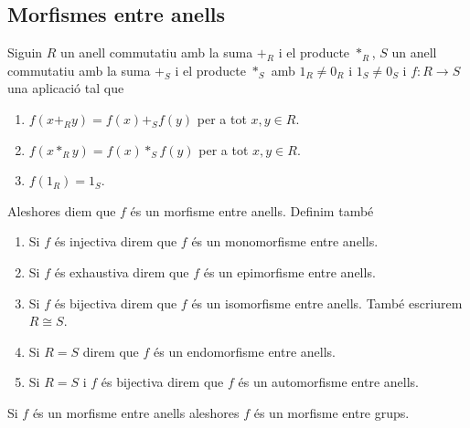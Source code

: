 \documentclass[../../Main.tex]{subfiles}
\begin{document}
	\subsection{Morfismes entre anells}
	\begin{definition}
		\label{def:morfisme entre anells}
		\label{def:epimorfisme entre anells}
		\label{def:monomorfisme entre anells}
		\label{def:isomorfisme entre anells}
		\label{def:endomorfisme entre anells}
		Siguin \(R\) un anell commutatiu amb la suma \(+_{R}\) i el producte \(\ast_{R}\), \(S\) un anell commutatiu amb la suma \(+_{S}\) i el producte \(\ast_{S}\) amb \(1_{R}\neq0_{R}\) i \(1_{S}\neq0_{S}\) i \(f\colon R\longrightarrow S\) una aplicació tal que
		\begin{enumerate}
			\item \(f(x+_{R}y)=f(x)+_{S}f(y)\) per a tot \(x,y\in R\).
			\item \(f(x\ast_{R}y)=f(x)\ast_{S}f(y)\) per a tot \(x,y\in R\).
			\item \(f(1_{R})=1_{S}\).
		\end{enumerate}
		Aleshores diem que \(f\) és un morfisme entre anells. Definim també
		\begin{enumerate}
			\item Si \(f\) és injectiva direm que \(f\) és un monomorfisme entre anells.
			\item Si \(f\) és exhaustiva direm que \(f\) és un epimorfisme entre anells.
			\item Si \(f\) és bijectiva direm que \(f\) és un isomorfisme entre anells. També escriurem \(R\cong S\).
			\item Si \(R=S\) direm que \(f\) és un endomorfisme entre anells.
			\item Si \(R=S\) i \(f\) és bijectiva direm que \(f\) és un automorfisme entre anells.
		\end{enumerate}
	\end{definition}
	\begin{observation}
		\label{obs:morfisme entre anells és morfisme entre grups}
		Si \(f\) és un morfisme entre anells aleshores \(f\) és un morfisme entre grups.
	\end{observation}
\end{document}
